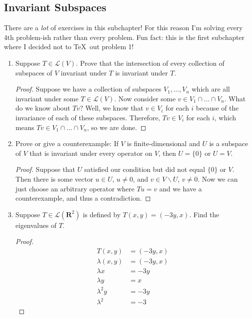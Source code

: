 \subsection{Invariant Subspaces}

There are a \emph{lot} of exercises in this subchapter! For this reason I'm solving every 4th problem-ish rather than every problem. Fun fact: this is the first subchapter where I decided not to \TeX\ out problem 1!

\begin{enumerate}
    \item[3] Suppose $T \in \mathcal{L}(V)$. Prove that the intersection of every collection of
        subspaces of $V$ invariant under $T$ is invariant under $T$.

    \begin{proof}
        Suppose we have a collection of subspaces $V_1, \dots, V_n$ which are all invariant under
        some $T \in \mathcal{L}(V)$. Now consider some $v \in V_1 \cap \dots \cap V_n$. What do we
        know about $Tv$? Well, we know that $v \in V_i$ for each $i$ because of the invariance
        of each of these subspaces. Therefore, $Tv \in V_i$ for each $i$, which means
        $Tv \in V_1 \cap \dots \cap V_n$, so we are done.
    \end{proof}

    \item[4] Prove or give a counterexample: If $V$ is finite-dimensional and $U$ is a subspace
        of $V$ that is invariant under every operator on $V$, then $U = \{0\}$ or $U = V$.

    \begin{proof}
        Suppose that $U$ satisfied our condition but did not equal $\{0\}$ or $V$. Then there is some vector $u \in U$, $u \neq 0$, and $v \in V \backslash U$, $v \neq 0$. Now we can just choose an arbitrary operator where $Tu = v$ and we have a counterexample, and thus a contradiction.
    \end{proof}

    \item[5] Suppose $T \in \mathcal{L}(\mathbf{R}^{2})$ is defined by $T(x, y) = (-3y, x)$. Find the eigenvalues of $T$.
    
    \begin{proof}
        \begin{align*}
            T(x, y) &= (-3y, x) \\
            \lambda(x, y) &= (-3y, x) \\
            \lambda x &= -3y \\
            \lambda y &= x \\
            \lambda^2y &= -3y \\
            \lambda^2 &= -3
        \end{align*}


\end{proof}
\end{enumerate}
